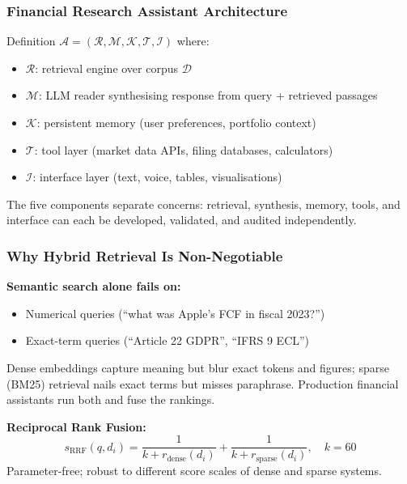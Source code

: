 \documentclass[9pt,t]{beamer}
\begin{document}
\begin{frame}
\frametitle{Financial Research Assistant Architecture}

\begin{block}{Definition}
$\mathcal{A} = (\mathcal{R}, \mathcal{M}, \mathcal{K}, \mathcal{T}, \mathcal{I})$ where:
\begin{itemize}
  \item $\mathcal{R}$: retrieval engine over corpus $\mathcal{D}$
  \item $\mathcal{M}$: LLM reader synthesising response from query + retrieved passages
  \item $\mathcal{K}$: persistent memory (user preferences, portfolio context)
  \item $\mathcal{T}$: tool layer (market data APIs, filing databases, calculators)
  \item $\mathcal{I}$: interface layer (text, voice, tables, visualisations)
\end{itemize}
\end{block}

\medskip
The five components separate concerns: retrieval, synthesis, memory, tools, and
interface can each be developed, validated, and audited independently.
\end{frame}

\begin{frame}
\frametitle{Why Hybrid Retrieval Is Non-Negotiable}

\textbf{Semantic search alone fails on:}
\begin{itemize}
  \item Numerical queries (``what was Apple's FCF in fiscal 2023?'')
  \item Exact-term queries (``Article 22 GDPR'', ``IFRS 9 ECL'')
\end{itemize}

\medskip
Dense embeddings capture meaning but blur exact tokens and figures; sparse
(BM25) retrieval nails exact terms but misses paraphrase. Production financial
assistants run both and fuse the rankings.

\medskip
\begin{underhood}
\textbf{Reciprocal Rank Fusion:}
\[
  s_{\text{RRF}}(q, d_i) = \frac{1}{k + r_{\text{dense}}(d_i)} + \frac{1}{k + r_{\text{sparse}}(d_i)}, \quad k = 60
\]
Parameter-free; robust to different score scales of dense and sparse systems.
\end{underhood}
\end{frame}
\end{document}
